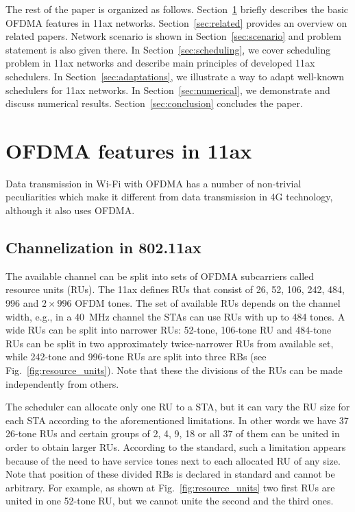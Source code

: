 The rest of the paper is organized as follows.
Section~\ref{sec:features} briefly describes the basic OFDMA features in 11ax networks.
Section~\ref{sec:related} provides an overview on related papers.
Network scenario is shown in Section~\ref{sec:scenario} and problem statement is also given there.
In Section~\ref{sec:scheduling}, we cover scheduling problem in 11ax networks and describe main principles of developed 11ax schedulers.
In Section~\ref{sec:adaptations}, we illustrate a way to adapt well-known schedulers for 11ax networks.
In Section~\ref{sec:numerical}, we demonstrate and discuss numerical results. 
Section~\ref{sec:conclusion} concludes the paper.
\section{OFDMA features in 11ax}
\label{sec:features}

Data transmission in Wi-Fi with OFDMA has a number of non-trivial peculiarities which make it different from data transmission in 4G technology, although it also uses OFDMA.

\subsection{Channelization in 802.11ax}
The available channel can be split into sets of OFDMA subcarriers called resource units (RUs).
The 11ax defines RUs that consist of 26, 52, 106, 242, 484, 996 and $2\times996$ OFDM tones.
The set of available RUs depends on the channel width, e.g., in a \SI{40}{\MHz} channel the STAs can use RUs with up to 484 tones.
A wide RUs can be split into narrower RUs: 52-tone, 106-tone RU and 484-tone RUs can be split in two approximately twice-narrower RUs from available set, while 242-tone and 996-tone RUs are split into three RBs (see Fig.~\ref{fig:resource_units}).
Note that these the divisions of the RUs can be made independently from others. 

The scheduler can allocate only one RU to a STA, but it can vary the RU size for each STA according to the aforementioned limitations.
In other words we have 37 26-tone RUs and certain groups of 2, 4, 9, 18 or all 37 of them can be united in order to obtain larger RUs.
According to the standard, such a limitation appears because of the need to have service tones next to each allocated RU of any size. 
Note that position of these divided RBs is declared in standard and cannot be arbitrary.
For example, as shown at Fig.~\ref{fig:resource_units} two first RUs are united in one 52-tone RU, but we cannot unite the second and the third ones.


